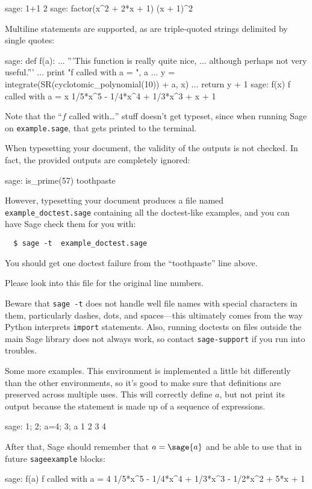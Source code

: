 \documentclass{article}
\begin{document}
\begin{sageexample}
  sage: 1+1
  2
  sage: factor(x^2 + 2*x + 1)
  (x + 1)^2
\end{sageexample}
Multiline statements are supported, as are triple-quoted strings
delimited by single quotes:
\renewcommand{\sageexampleincludetextoutput}{False}
\begin{sageexample}
  sage: def f(a):
  ...       '''This function is really quite nice,
  ...       although perhaps not very useful.'''
  ...       print "f called with a = ", a
  ...       y = integrate(SR(cyclotomic_polynomial(10)) + a, x)
  ...       return y + 1
  sage: f(x)
  f called with a =  x
  1/5*x^5 - 1/4*x^4 + 1/3*x^3 + x + 1
\end{sageexample}
Note that the ``$f$ called with\ldots'' stuff doesn't get typeset, since
when running Sage on \texttt{example.sage}, that gets printed to the
terminal.

When typesetting your document, the validity of the outputs is not
checked. In fact, the provided outputs are completely ignored:
\renewcommand{\sageexampleincludetextoutput}{True}
\begin{sageexample}
  sage: is_prime(57)
  toothpaste
\end{sageexample}
\renewcommand{\sageexampleincludetextoutput}{False}

However, typesetting your document produces a file named
\texttt{example\_doctest.sage} containing all the doctest-like examples,
and you can have Sage check them for you with:
\begin{verbatim}
  $ sage -t  example_doctest.sage
\end{verbatim}
You should get one doctest failure from the ``toothpaste'' line above.

Please look into this file for the original line numbers.

Beware that \texttt{sage -t} does not handle well file names with
special characters in them, particularly dashes, dots, and spaces---this
ultimately comes from the way Python interprets \texttt{import}
statements. Also, running doctests on files outside the main Sage
library does not always work, so contact \texttt{sage-support} if you
run into troubles.

Some more examples. This environment is implemented a little bit
differently than the other environments, so it's good to make sure that
definitions are preserved across multiple uses. This will correctly
define $a$, but not print its output because the statement is made up of
a sequence of expressions.
\begin{sageexample}
  sage: 1; 2; a=4; 3; a
  1
  2
  3
  4
\end{sageexample}
After that, Sage should remember that $a = \sage{a}$ and be able to use
that in future \texttt{sageexample} blocks:
\begin{sageexample}
  sage: f(a)
  f called with a =  4
  1/5*x^5 - 1/4*x^4 + 1/3*x^3 - 1/2*x^2 + 5*x + 1
\end{sageexample}
\end{document}
